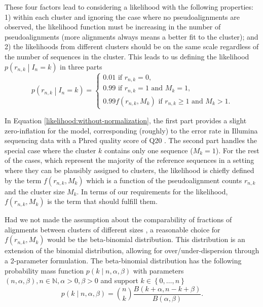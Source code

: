 \documentclass[officiallayout]{tktla}
\begin{document}
These four factors lead to considering a likelihood with the following
properties: 1) within each cluster and ignoring the case where no
pseudoalignments are observed, the likelihood function must be
increasing in the number of pseudoalignments (more alignments always
means a better fit to the cluster); and 2) the likelihoods from different
clusters should be on the same scale regardless of the number of
sequences in the cluster. This leads to us
defining the likelihood $p\left(r_{n, k} \middle| I_{n} = k\right)$ in
three parts
\begin{equation}
  \label{likelihood:without-normalization}
  p\left(r_{n, k} \middle| I_{n} = k\right) =
  \begin{cases}
    0.01\text{ if } r_{n, k} = 0, \\
    0.99\text{ if } r_{n, k} = 1 \text{ and } M_{k} = 1, \\
    0.99f\left(r_{n, k}, M_{k}\right)\text{ if } r_{n, k} \geq 1\text{ and } M_{k} > 1.
  \end{cases}
\end{equation}

In Equation \ref{likelihood:without-normalization}, the first part
provides a slight zero-inflation for the model, corresponding
(roughly) to the error rate in Illumina sequencing data with a Phred
quality score of Q20 \citep{ewing1998baseone, ewing1998basetwo}. The
second part handles the special case where the cluster $k$ contains
only one sequence ($M_{k} = 1$). For the rest of the cases, which
represent the majority of the reference sequences in a setting where
they can be plausibly assigned to clusters, the likelihood is chiefly
defined by the term $f\left(r_{n, k}, M_{k}\right)$ which is a
function of the pseudoalignment counts $r_{n, k}$ and the cluster size
$M_{k}$. In terms of our requirements for the likelihood,
$f\left(r_{n, k}, M_{k}\right)$ is the term that should fulfill them.

Had we not made the assumption about the comparability of fractions of
alignments between clusters of different sizes , a reasonable choice
for $f\left(r_{n, k}, M_{k}\right)$ would be the beta-binomial
distribution. This distribution is an extension of the binomial
distribution, allowing for over/under-dispersion through a 2-parameter
formulation. The beta-binomial distribution has the following
probability mass function $p\left(k \middle | n, \alpha, \beta\right)$
with parameters $\left(n, \alpha, \beta\right), n \in \mathbb{N},
\alpha > 0, \beta > 0$ and support $k \in \left\{0, \dots, n\right\}$
\begin{equation}
  \label{likelihood:beta-binomial-pmf}
  p\left(k \middle| n, \alpha, \beta\right) = \binom{n}{k}\frac{B\left(k + \alpha, n - k + \beta\right)}{B\left(\alpha, \beta\right)}.
\end{equation}
\end{document}
